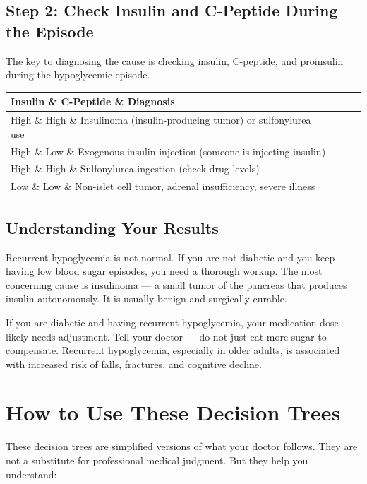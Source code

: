 \subsection{Step 2: Check Insulin and C-Peptide During the Episode}

The key to diagnosing the cause is checking insulin, C-peptide, and proinsulin during the hypoglycemic episode.

\begin{longtable}{@{}llll@{}}
\toprule
\textbf{Insulin} \& \textbf{C-Peptide} \& \textbf{Diagnosis} \\
\midrule
High \& High \& Insulinoma (insulin-producing tumor) or sulfonylurea use \\
High \& Low \& Exogenous insulin injection (someone is injecting insulin) \\
High \& High \& Sulfonylurea ingestion (check drug levels) \\
Low \& Low \& Non-islet cell tumor, adrenal insufficiency, severe illness \\
\bottomrule
\end{longtable}

\subsection{Understanding Your Results}

Recurrent hypoglycemia is not normal. If you are not diabetic and you keep having low blood sugar episodes, you need a thorough workup. The most concerning cause is insulinoma --- a small tumor of the pancreas that produces insulin autonomously. It is usually benign and surgically curable.

If you are diabetic and having recurrent hypoglycemia, your medication dose likely needs adjustment. Tell your doctor --- do not just eat more sugar to compensate. Recurrent hypoglycemia, especially in older adults, is associated with increased risk of falls, fractures, and cognitive decline.

\clearpage
\section{How to Use These Decision Trees}

These decision trees are simplified versions of what your doctor follows. They are not a substitute for professional medical judgment. But they help you understand:

